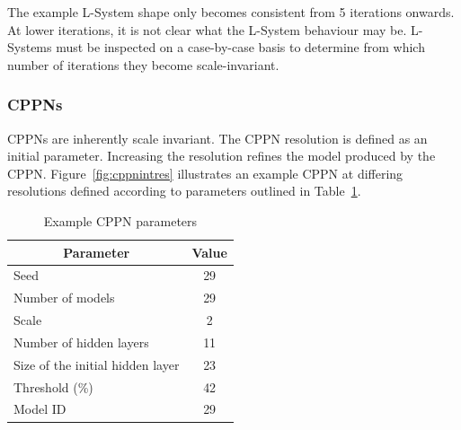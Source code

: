 The example L-System shape only becomes consistent from 5 iterations onwards. At lower iterations, it is not clear what the L-System behaviour may be. L-Systems must be inspected on a case-by-case basis to determine from which number of iterations they become scale-invariant.

\subsubsection{CPPNs}

CPPNs are inherently scale invariant. The CPPN resolution is defined as an initial parameter. Increasing the resolution refines the model produced by the CPPN. Figure~\ref{fig:cppnintres} illustrates an example CPPN at differing resolutions defined according to parameters outlined in Table~\ref{tab:cppnexpar}.

\begin{table}[H]
\centering
\caption{Example CPPN parameters}
\label{tab:cppnexpar}
\begin{tabular}{@{}lc@{}}
\toprule
\multicolumn{1}{c}{\textbf{Parameter}} & \textbf{Value} \\ \midrule
Seed                                   & 29             \\
Number of models                       & 29             \\
Scale                                  & 2              \\
Number of hidden layers                & 11             \\
Size of the initial hidden layer       & 23             \\
Threshold (\%)                         & 42             \\
Model ID                               & 29             \\ \bottomrule
\end{tabular}
\end{table}

